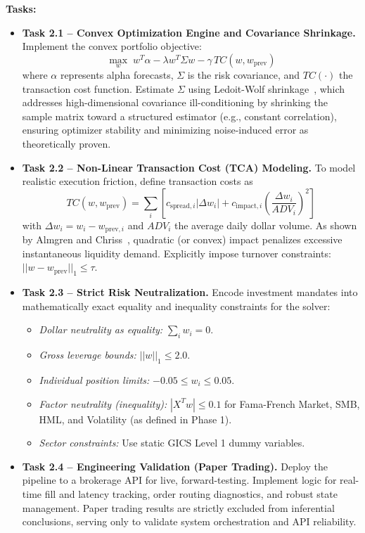 \documentclass[twoside,final]{hcmut-report}
\begin{document}
\vspace{0.5em}
\textbf{Tasks:}
\begin{itemize}
  \item \textbf{Task 2.1 -- Convex Optimization Engine and Covariance Shrinkage.} Implement the convex portfolio objective:
        \[
          \max_{w} \; w^T \alpha - \lambda w^T \Sigma w - \gamma \, TC(w, w_{\text{prev}})
        \]
        where $\alpha$ represents alpha forecasts, $\Sigma$ is the risk covariance, and $TC(\cdot)$ the transaction cost function. Estimate $\Sigma$ using Ledoit-Wolf shrinkage~\cite{LedoitWolf2004}, which addresses high-dimensional covariance ill-conditioning by shrinking the sample matrix toward a structured estimator (e.g., constant correlation), ensuring optimizer stability and minimizing noise-induced error as theoretically proven.

  \item \textbf{Task 2.2 -- Non-Linear Transaction Cost (TCA) Modeling.} To model realistic execution friction, define transaction costs as
        \[
          TC(w, w_{\text{prev}}) = \sum_{i} \left[ c_{\text{spread},i}|\Delta w_i| + c_{\text{impact},i} \left( \frac{\Delta w_i}{ADV_i} \right)^2 \right]
        \]
        with $\Delta w_i = w_i - w_{\text{prev},i}$ and $ADV_i$ the average daily dollar volume. As shown by Almgren and Chriss~\cite{AlmgrenChriss2000}, quadratic (or convex) impact penalizes excessive instantaneous liquidity demand. Explicitly impose turnover constraints: $||w - w_{\text{prev}}||_1 \le \tau$.

  \item \textbf{Task 2.3 -- Strict Risk Neutralization.} Encode investment mandates into mathematically exact equality and inequality constraints for the solver:
        \begin{itemize}
          \item \textit{Dollar neutrality as equality:} $\sum_i w_i = 0$.
          \item \textit{Gross leverage bounds:} $||w||_1 \leq 2.0$.
          \item \textit{Individual position limits:} $-0.05 \leq w_i \leq 0.05$.
          \item \textit{Factor neutrality (inequality):} $|X^T w| \leq 0.1$ for Fama-French Market, SMB, HML, and Volatility (as defined in Phase 1).
          \item \textit{Sector constraints:} Use static GICS Level 1 dummy variables.
        \end{itemize}

  \item \textbf{Task 2.4 -- Engineering Validation (Paper Trading).} Deploy the pipeline to a brokerage API for live, forward-testing. Implement logic for real-time fill and latency tracking, order routing diagnostics, and robust state management. Paper trading results are strictly excluded from inferential conclusions, serving only to validate system orchestration and API reliability.
\end{itemize}
\end{document}
